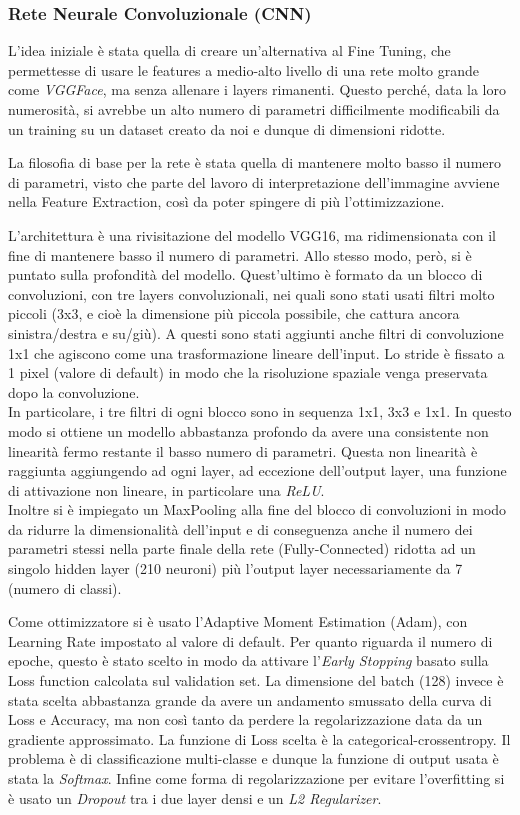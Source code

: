 \subsubsection{Rete Neurale Convoluzionale (CNN)}

L'idea iniziale è stata quella di creare un'alternativa al Fine Tuning, che permettesse di usare le features a medio-alto livello di una rete molto grande come  \textit{VGGFace}, ma senza allenare i layers rimanenti. Questo perché, data la loro numerosità, si avrebbe un alto numero di parametri difficilmente modificabili da un training su un dataset creato da noi e dunque di dimensioni ridotte. 

La filosofia di base per la rete è stata quella di mantenere molto basso il numero di parametri, visto che parte del lavoro di interpretazione dell'immagine avviene nella Feature Extraction, così da poter spingere di più l'ottimizzazione.

L'architettura è una rivisitazione del modello VGG16, ma ridimensionata con il fine di mantenere basso il numero di parametri. Allo stesso modo, però, si è puntato sulla profondità del modello. Quest'ultimo è formato da un blocco di convoluzioni, con tre layers convoluzionali, nei quali sono stati usati filtri molto piccoli (3x3, e cioè la dimensione più piccola possibile, che cattura ancora sinistra/destra e su/giù). A questi sono stati aggiunti anche filtri di convoluzione 1x1 che agiscono come una trasformazione lineare dell'input. Lo stride è fissato a 1 pixel (valore di default) in modo che la risoluzione spaziale venga preservata dopo la convoluzione.\\
In particolare, i tre filtri di ogni blocco sono in sequenza 1x1, 3x3 e 1x1. In questo modo si ottiene un modello abbastanza profondo da avere una consistente non linearità fermo restante il basso numero di parametri. Questa non linearità è raggiunta aggiungendo ad ogni layer, ad eccezione dell'output layer, una funzione di attivazione non lineare, in particolare una  \textit{ReLU}. \\
Inoltre si è impiegato un MaxPooling alla fine del blocco di convoluzioni in modo da ridurre la dimensionalità dell'input e di conseguenza anche il numero dei parametri stessi nella parte finale della rete (Fully-Connected) ridotta ad un singolo hidden layer (210 neuroni) più l'output layer necessariamente da 7 (numero di classi).

Come ottimizzatore si è usato l’Adaptive Moment Estimation (Adam), con Learning Rate impostato al valore di default.
Per quanto riguarda il numero di epoche, questo è stato scelto in modo da attivare l'\textit{Early Stopping} basato sulla Loss function calcolata sul validation set. 
La dimensione del batch (128) invece è stata scelta abbastanza grande da avere un andamento smussato della curva di Loss e Accuracy, ma non così tanto da perdere la regolarizzazione data da un gradiente approssimato.
La funzione di Loss scelta è la categorical-crossentropy. Il problema è di classificazione multi-classe e dunque la funzione di output usata è stata la \textit{Softmax}.
Infine come forma di regolarizzazione per evitare l'overfitting si è usato un \textit{Dropout} tra i due layer densi e un \textit{L2 Regularizer}.


